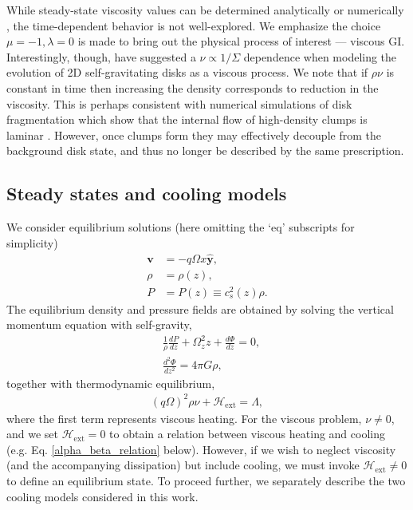 While steady-state viscosity values can be determined 
analytically or numerically \citep[e.g.][]{martin11,kratter08,rafikov15}, the time-dependent behavior is
not well-explored. We emphasize the choice $\mu=-1,\lambda=0$ is made
to bring out the physical process of interest --- viscous GI. 
Interestingly, though, \cite{laughlin96b} have suggested a $\nu \propto 1/\Sigma$
dependence when modeling the evolution of 2D self-gravitating disks 
as a viscous process. We note that if $\rho\nu$ is constant in time
then increasing the density corresponds to reduction in the viscosity. 
This is perhaps consistent with numerical simulations of disk
fragmentation which show that the internal flow of high-density clumps
is laminar \citep{gammie01}. However, once clumps form they may
effectively decouple from the background disk state, and thus no 
longer be described by the same prescription. 

\subsection{Steady states and cooling models}
We consider equilibrium solutions (here omitting the `eq' subscripts
for simplicity)  
\begin{align}
  \bm{v} &= -q\Omega x \hat{\bm{y}}, \\
  \rho   &= \rho(z),\\
  P      &= P(z) \equiv c_s^2(z)\rho.
\end{align} 
The equilibrium density and pressure fields are obtained by solving
the vertical momentum equation with self-gravity,
\begin{align}
  &\frac{1}{\rho}\frac{dP}{dz} +
  \Omega_z^2z + \frac{d\Phi}{dz} = 0, \label{vert_eq1}\\
 &\frac{d^2\Phi}{dz^2} = 4 \pi G \rho,\label{vert_eq2}
\end{align}
together with thermodynamic equilibrium,
\begin{align}\label{thermal_eq}
(q\Omega)^2\rho\nu + \mathcal{H}_\mathrm{ext} = \Lambda,
\end{align}
where the first term represents viscous heating. For the viscous
problem, $\nu\neq0$, and we set $\mathcal{H}_\mathrm{ext}=0$ to 
obtain a relation between viscous heating and cooling 
(e.g. Eq. \ref{alpha_beta_relation} below). However,
if we wish to neglect viscosity (and the accompanying dissipation) but include cooling, we must invoke
$\mathcal{H}_\mathrm{ext}\neq0$ to define an equilibrium state.  
To proceed further, we separately describe the two cooling models
considered in this work. 



